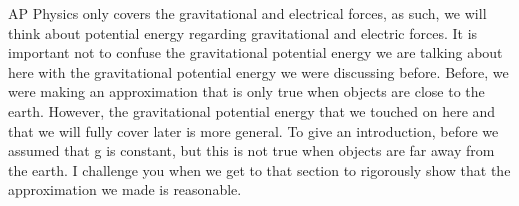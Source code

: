 AP Physics only covers the gravitational and electrical forces, as such, we will think about potential energy regarding gravitational and electric forces. It is important not to confuse the gravitational potential energy we are talking about here with the gravitational potential energy we were discussing before. Before, we were making an approximation that is only true when objects are close to the earth. However, the gravitational potential energy that we touched on here and that we will fully cover later is more general. To give an introduction, before we assumed that g is constant, but this is not true when objects are far away from the earth. I challenge you when we get to that section to rigorously show that the approximation we made is reasonable.